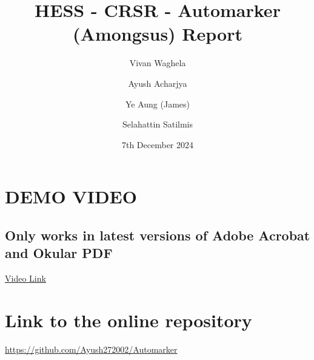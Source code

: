 \documentclass[a4paper, 12pt]{article}
\begin{document}
\title{HESS - CRSR - Automarker (Amongsus) Report}
\author{Vivan Waghela \and Ayush Acharjya \and Ye Aung (James) \and Selahattin Satilmis}
\date{7th December 2024}
\maketitle

\section*{DEMO VIDEO}
\subsection*{Only works in latest versions of Adobe Acrobat and Okular PDF}
\noindent\href{run:demo.mp4}{Video Link}

\vspace{3mm}

\noindent{}

\section*{Link to the online repository}
\noindent\url{https://github.com/Ayush272002/Automarker}
\end{document}
